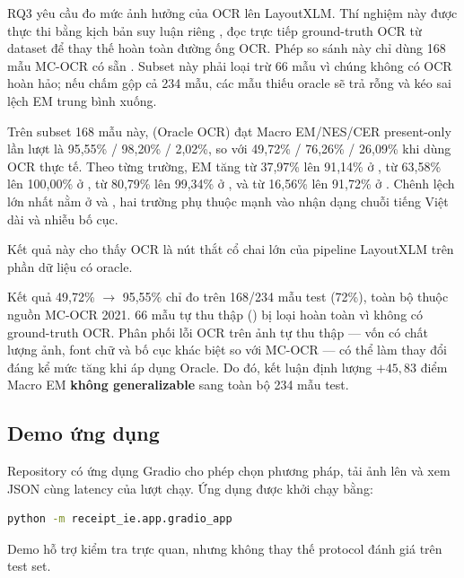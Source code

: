 RQ3 yêu cầu đo mức ảnh hưởng của OCR lên LayoutXLM. Thí nghiệm này được thực thi bằng kịch bản suy luận riêng , đọc trực tiếp ground-truth OCR từ dataset để thay thế hoàn toàn đường ống OCR. Phép so sánh này chỉ dùng 168 mẫu MC-OCR có sẵn . Subset này phải loại trừ 66 mẫu  vì chúng không có OCR hoàn hảo; nếu chấm gộp cả 234 mẫu, các mẫu thiếu oracle sẽ trả rỗng và kéo sai lệch EM trung bình xuống.



Trên subset 168 mẫu này,  (Oracle OCR) đạt Macro EM/NES/CER present-only lần lượt là 95,55\% / 98,20\% / 2,02\%, so với 49,72\% / 76,26\% / 26,09\% khi dùng OCR thực tế. Theo từng trường, EM tăng từ 37,97\% lên 91,14\% ở , từ 63,58\% lên 100,00\% ở , từ 80,79\% lên 99,34\% ở , và từ 16,56\% lên 91,72\% ở . Chênh lệch lớn nhất nằm ở  và , hai trường phụ thuộc mạnh vào nhận dạng chuỗi tiếng Việt dài và nhiễu bố cục.

Kết quả này cho thấy OCR là nút thắt cổ chai lớn của pipeline LayoutXLM trên phần dữ liệu có oracle.

\begin{warnbox}
Kết quả 49,72\% $\rightarrow$ 95,55\% chỉ đo trên 168/234 mẫu test (72\%), toàn bộ thuộc nguồn MC-OCR 2021. 66 mẫu tự thu thập () bị loại hoàn toàn vì không có ground-truth OCR. Phân phối lỗi OCR trên ảnh tự thu thập — vốn có chất lượng ảnh, font chữ và bố cục khác biệt so với MC-OCR — có thể làm thay đổi đáng kể mức tăng khi áp dụng Oracle. Do đó, kết luận định lượng $+45{,}83$ điểm Macro EM \textbf{không generalizable} sang toàn bộ 234 mẫu test.
\end{warnbox}

\subsection{Demo ứng dụng}
\label{subsec:demo}

Repository có ứng dụng Gradio cho phép chọn phương pháp, tải ảnh lên và xem JSON cùng latency của lượt chạy. Ứng dụng được khởi chạy bằng:
\begin{lstlisting}[language=bash]
python -m receipt_ie.app.gradio_app
\end{lstlisting}
Demo hỗ trợ kiểm tra trực quan, nhưng không thay thế protocol đánh giá trên test set.
